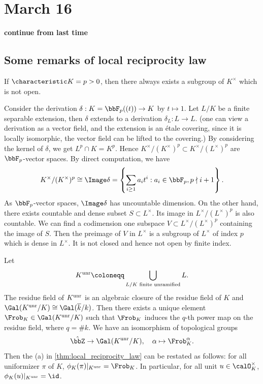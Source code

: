 \section{March 16}

\textbf{continue from last time}

\subsection{Some remarks of local reciprocity law}

  \begin{remark}
    If $\characteristic K = p > 0$, then there always exists a subgroup of $K^\times$ which is not open.

    Consider the derivation $\delta: K=\bbF_p((t)) \to K$ by $t \mapsto 1$. 
    Let $L/K$ be a finite separable extension, then $\delta$ extends to a derivation $\delta_L: L \to L$.
    (one can view a derivation as a vector field, and the extension is an \'etale covering, since it is locally isomorphic, the vector field can be lifted to the covering.)
    By considering the kernel of $\delta$, we get $L^p \cap K = K^p$.
    Hence $K^\times / (K^\times)^p \subset K^\times / (L^\times)^p$ are $\bbF_p$-vector spaces.
    By direct computation, we have
    \[ K^\times / (K^\times)^p \cong \Image \delta = \left\{ \sum_{i \geq 1} a_i t^i : a_i \in \bbF_p, p \nmid i+1 \right\}. \]
    As $\bbF_p$-vector spaces, $\Image \delta$ has uncountable dimension.
    On the other hand, there exists countable and dense subset $S \subset L^\times$.
    Its image in $L^\times / (L^\times)^p$ is also countable. 
    We can find a codimension one subspace $V \subset L^\times / (L^\times)^p$ containing the image of $S$.
    Then the preimage of $V$ in $L^\times$ is a subgroup of $L^\times$ of index $p$ which is dense in $L^\times$.
    It is not closed and hence not open by finite index.
  \end{remark}

  \begin{remark}\label{rmk:unit_has_trivial_image_under_artin_local_map_when_restrict_to_unramified_extension}
    Let 
    \[ K^\unr \coloneqq \bigcup_{L/K \text{ finite unramified}} L. \]
    The residue field of $K^{\mathrm{unr}}$ is an algebraic closure of the residue field of $K$ and $\Gal(K^\unr/K) \cong \Gal(\overline{k}/k)$.
    Then there exists a unique element $\Frob_K \in \Gal(K^\unr/K)$ such that $\Frob_K$ induces the $q$-th power map on the residue field, where $q = \# k$.
    We have an isomorphism of topological groups
    \[ \hat{\bbZ} \to \Gal(K^\unr/K), \quad \alpha \mapsto \Frob_K^\alpha. \]
    Then the (a) in \cref{thm:local_reciprocity_law} can be restated as follows: for all uniformizer $\pi$ of $K$, $\phi_K(\pi)|_{K^\unr} = \Frob_K$.
    In particular, for all unit $u \in \calO_K^\times$, $\phi_K(u)|_{K^\unr} = \id$.
  \end{remark}

